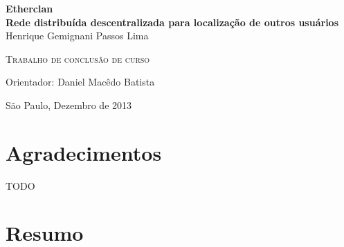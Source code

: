 \documentclass[11pt,twoside,a4paper]{book}
\begin{document}
\frontmatter 
\fancyhead[RO]{{\footnotesize\rightmark}\hspace{2em}\thepage}
\setcounter{tocdepth}{2}
\fancyhead[LE]{\thepage\hspace{2em}\footnotesize{\leftmark}}
\fancyhead[RE,LO]{}
\fancyhead[RO]{{\footnotesize\rightmark}\hspace{2em}\thepage}

\onehalfspacing  %

\thispagestyle{empty}
\begin{center}
    \vspace*{2.3cm}
    \textbf{
        {\LARGE Etherclan}\\
        \vspace*{0.5cm}
        {\Large Rede distribuída descentralizada para localização de outros usuários
        }
    }\\
    
    \vspace*{1.2cm}
    \Large{Henrique Gemignani Passos Lima}
    
    \vskip 2cm
    \textsc{Trabalho de conclusão de curso} 
    
    \vskip 10cm
    Orientador: Daniel Macêdo Batista

   	\vskip 3cm
    
    \normalsize{São Paulo, Dezembro de 2013}
\end{center}


\chapter*{Agradecimentos}

TODO

\chapter*{Resumo}
\end{document}
